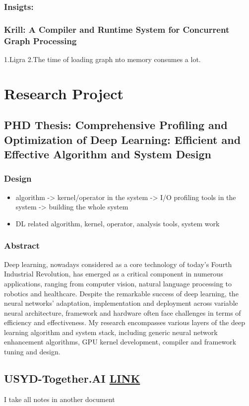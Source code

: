 \documentclass[8pt,UTF8]{article}
\begin{document}
        \subsubsection{Insigts:}
        \subsubsection{Krill: A Compiler and Runtime System for Concurrent Graph Processing}
            1.Ligra 
            2.The time of loading graph nto memory consumes a lot. 

\section{Research Project}
    \subsection{PHD Thesis: Comprehensive Profiling and Optimization of Deep Learning: Efficient and Effective Algorithm and System Design}
        \subsubsection{Design}
            \begin{itemize}
                \item algorithm -> kernel/operator in the system -> I/O profiling tools in the system -> building the whole system
                \item DL related algorithm, kernel, operator, analysis tools, system work
            \end{itemize}
        \subsubsection{Abstract}
            Deep learning, nowadays considered as a core technology of today’s Fourth Industrial Revolution, has emerged as a critical component in numerous applications, ranging from computer vision, natural language processing to robotics and healthcare. Despite the remarkable success of deep learning, the neural networks' adaptation, implementation and deployment across variable neural architecture, framework and hardware often face challenges in terms of efficiency and effectiveness. My research encompasses various layers of the deep learning algorithm and system stack, including generic neural network enhancement algorithms, GPU kernel development, compiler and framework tuning and design.
    \subsection{USYD-Together.AI \href{https://www.overleaf.com/project/661e91372c7e08ac2708b23a}{LINK}}
        I take all notes in another document
\end{document}
